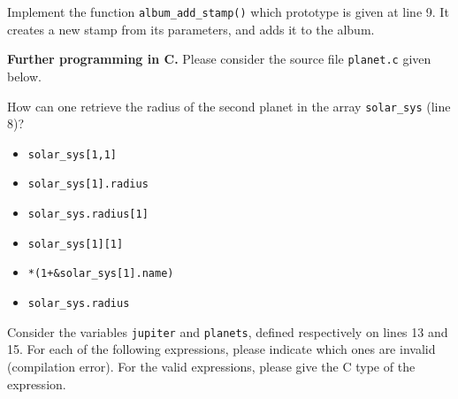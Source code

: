 \documentclass[10pt]{article}\usepackage[enonce]{exemptty}
\newenvironment{Live}%
    {\color{RoyalPurple}}%
    {\color{black}}
\begin{document}
\begin{Live}
  
\Question Implement the function \texttt{album\_add\_stamp()} which prototype is
given at line 9. It creates a new stamp from its parameters, and adds it to the
album.


\Exercise\textbf{Further programming in C.}
Please consider the source file  \texttt{planet.c} given below.

\smallskip%
\Question How can one retrieve the radius of the second planet in the array
\texttt{solar\_sys} (line 8)?

\noindent
\begin{minipage}{.33\linewidth}
  \begin{itemize}
  \item[\fbox{a}] \verb+solar_sys[1,1]+
  \item[\fbox{b}] \verb+solar_sys[1].radius+
  \end{itemize}  
\end{minipage}
\begin{minipage}{.33\linewidth}
  \begin{itemize}
  \item[\fbox{c}] \verb+solar_sys.radius[1]+
  \item[\fbox{d}] \verb|solar_sys[1][1]|
  \end{itemize}  
\end{minipage}
\begin{minipage}{.33\linewidth}
  \begin{itemize}  
  \item[\fbox{e}] \verb|*(1+&solar_sys[1].name)|
  \item[\fbox{f}] \verb+solar_sys.radius+
  \end{itemize}  
\end{minipage}

\smallskip%
\Question Consider the variables \texttt{jupiter} and \texttt{planets}, defined
respectively on lines 13 and 15. For each of the following expressions, please
indicate which ones are invalid (compilation error). For the valid expressions,
please give the C type of the expression.


\end{Live}
\end{document}
